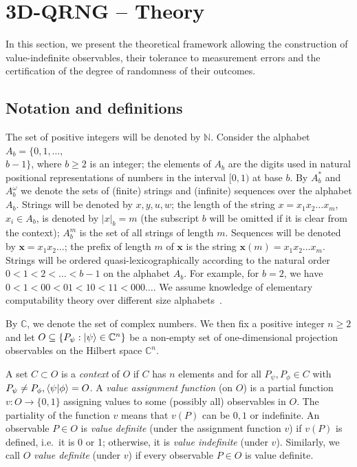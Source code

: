 \documentclass[l1pt]{elsarticle}
\newcommand{\bbbn}{\mathbb{N}}
\begin{document}
\section{3D-QRNG -- Theory}
\label{3dqrngtheory}

In this section, we present the theoretical framework allowing the construction of value-indefinite observables, their tolerance to measurement errors and the certification of the degree of randomness of their outcomes.


\subsection{Notation and definitions}
\label{notat}
The set of positive integers will be denoted by $\bbbn$. Consider the alphabet
$A_{b}=\{0,1,\dots, $ \\$b-1\}$, where $b\ge 2$ is an integer; the elements of
$A_b$ are the digits used in natural positional
representations of numbers in the interval $[0,1)$ at base $b$. By  $A_{b}^{*}$
and  $A_{b}^{\omega}$ we denote the sets of (finite)  strings and (infinite)
sequences over the alphabet $A_{b}$. Strings will be denoted by $x,y,u,w$; the
length of the string $x= x_1x_2\dots x_m$, $x_i\in A_{b}$, is denoted by
$|x|_{b}=m$ (the subscript $b$ will be omitted if it is clear from the
context); $A_{b}^{m}$ is the set of all strings of length $m$.  Sequences will
be denoted by $\mathbf{x}= x_1x_2\dots$; the prefix of length $m$ of
$\mathbf{x}$ is the string $ \mathbf{x}(m)= x_1x_2\dots x_m$.
Strings
will be ordered quasi-lexicographically according to the natural order $0<1<2  < \dots <b-1$ on the
alphabet $A_{b}$. For example, for $b=2$, we have $0<1<00<01<10<11<000 \dots$.
We
assume knowledge of elementary computability theory over different size
alphabets~\cite{calude:02}.

By $\mathbb{C}$, we denote the set of complex numbers.
We then fix a positive integer $n\geq 2$ and let $O \subseteq \{  P_{\psi}:  \ket{\psi} \in \mathbb{C}^{n} \}$ be a non-empty set of one-dimensional projection observables on the Hilbert space $\mathbb{C}^{n}$.


A set $C \subset O$ is a {\it  context} of $O$ if $C$ has $n$ elements  and for all $P_{\psi}, P_{\phi} \in C$ with $P_{\psi} \neq P_{\phi}, \braket{\psi}{\phi} = O$.
A  {\it  value assignment function} (on $O$) is a partial function $v:O\to \{0,1\}$ assigning values to some (possibly all) observables in $O$.  The partiality of the  function $v$ means that $v(P)$ can be $0,1$ or indefinite.
An observable $P \in O$ is  {\it  value definite} (under the assignment function $v$)  if $v(P)$ is defined, i.e.~it is 0 or 1; otherwise, it is  {\it  value indefinite} (under $v$). Similarly, we call $O$  {\it  value definite} (under $v$) if every observable $P \in O$ is value definite.
\end{document}
